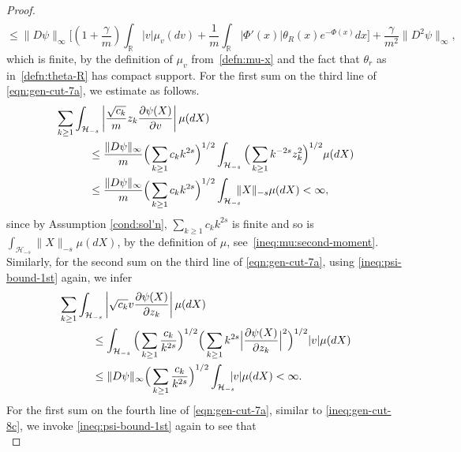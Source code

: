 \documentclass[11pt]{amsart}
\theoremstyle{definition}
\newcommand{\rbb}{\mathbb{R}}
\theoremstyle{definition}
\theoremstyle{plain}
\numberwithin{equation}{section}
\begin{document}
\begin{proof}
\begin{multline}
\end{multline}
\begin{displaymath}
\leq\| D\psi\|_\infty\Big[\left(1+\frac{\gamma}{m}\right)\int_\rbb |v|\mu_v(dv)+\frac{1}{m}\int_\rbb \left|\Phi'(x)\right|\theta_R(x)e^{-\Phi(x)}dx\Big]+\frac{\gamma}{m^2}\| D^2\psi\|_\infty,
\end{displaymath}
which is finite, by the definition of $\mu_v$ from~\eqref{defn:mu-x} and the fact that $\theta_r$  as in~\eqref{defn:theta-R} has compact support. For the first sum on the third line of \eqref{eqn:gen-cut-7a}, we estimate as follows.
\begin{equation}\label{ineq:gen-cut-8b}
\begin{aligned}
\MoveEqLeft[3]\sum_{k\geq 1}\int_{\mathcal{H}_{-s}} \left|\frac{\sqrt{c_k}}{m}z_k\frac{\partial \psi(X)}{\partial v}\right|\mu(dX)\\
&\leq \frac{\| D\psi\|_\infty}{m}\Big(\sum_{k\geq 1}c_kk^{2s}\Big)^{1/2}\int_{\mathcal{H}_{-s}}\Big(\sum_{k\geq 1}k^{-2s}z_k^2\Big)^{1/2}\mu(dX)\\
&\leq \frac{\| D\psi\|_\infty}{m}\Big(\sum_{k\geq 1}c_kk^{2s}\Big)^{1/2}\int_{\mathcal{H}_{-s}}\!\!\!\!\|X\|_{-s}\mu(dX)<\infty,
\end{aligned}
\end{equation}
since by Assumption \ref{cond:sol'n}, $\sum_{k\geq 1}c_kk^{2s}$ is finite and so is $\int_{\mathcal{H}_{-s}}\|X\|_{-s}\mu(dX)$, by the definition of $\mu$, see~\eqref{ineq:mu:second-moment}. Similarly, for the second sum on the third line of \eqref{eqn:gen-cut-7a}, using \eqref{ineq:psi-bound-1st} again, we infer
\begin{equation}\label{ineq:gen-cut-8c}
\begin{aligned}
\MoveEqLeft[3]
\sum_{k\geq 1}\int_{\mathcal{H}_{-s}}\left|\sqrt{c_k}v\frac{\partial \psi(X)}{\partial z_k}\right|\mu(dX)\\
&\leq \int_{\mathcal{H}_{-s}} \Big(\sum_{k\geq 1}\frac{c_k}{k^{2s}}\Big)^{1/2}\Big(\sum_{k\geq 1}k^{2s}\Big|\frac{\partial \psi(X)}{\partial z_k}\Big|^2\Big)^{1/2}|v|\mu(dX)\\
&\leq  \| D\psi\|_\infty\Big(\sum_{k\geq 1}\frac{c_k}{k^{2s}}\Big)^{1/2}\int_{\mathcal{H}_{-s}}\!\!\!\!|v|\mu(dX)<\infty.
\end{aligned}
\end{equation}
For the first sum on the fourth line of \eqref{eqn:gen-cut-7a}, similar to \eqref{ineq:gen-cut-8c}, we invoke \eqref{ineq:psi-bound-1st} again to see that
\begin{equation} \label{ineq:gen-cut-8d}

\end{equation}
\end{proof}
\end{document}
